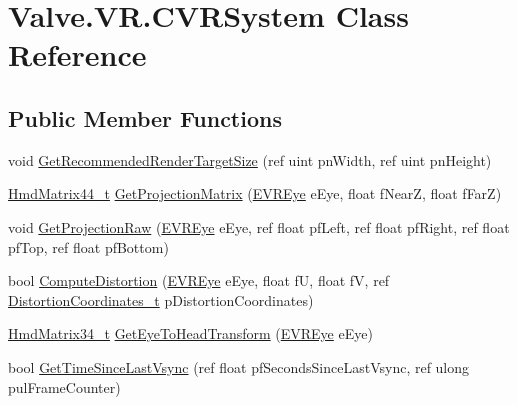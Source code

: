 \hypertarget{class_valve_1_1_v_r_1_1_c_v_r_system}{}\section{Valve.\+V\+R.\+C\+V\+R\+System Class Reference}
\label{class_valve_1_1_v_r_1_1_c_v_r_system}
\subsection*{Public Member Functions}
\begin{DoxyCompactItemize}
\item 
void \mbox{\hyperlink{class_valve_1_1_v_r_1_1_c_v_r_system_a51783a0590f7d858c6b7a073c961e910}{Get\+Recommended\+Render\+Target\+Size}} (ref uint pn\+Width, ref uint pn\+Height)
\item 
\mbox{\hyperlink{struct_valve_1_1_v_r_1_1_hmd_matrix44__t}{Hmd\+Matrix44\+\_\+t}} \mbox{\hyperlink{class_valve_1_1_v_r_1_1_c_v_r_system_a8e06a8dc62a3d7d82a8672a024d4a3d3}{Get\+Projection\+Matrix}} (\mbox{\hyperlink{namespace_valve_1_1_v_r_a8153d4a3e627e1cede046327087c1880}{E\+V\+R\+Eye}} e\+Eye, float f\+NearZ, float f\+FarZ)
\item 
void \mbox{\hyperlink{class_valve_1_1_v_r_1_1_c_v_r_system_a6154e9257dca79f7c208c3e737160d4f}{Get\+Projection\+Raw}} (\mbox{\hyperlink{namespace_valve_1_1_v_r_a8153d4a3e627e1cede046327087c1880}{E\+V\+R\+Eye}} e\+Eye, ref float pf\+Left, ref float pf\+Right, ref float pf\+Top, ref float pf\+Bottom)
\item 
bool \mbox{\hyperlink{class_valve_1_1_v_r_1_1_c_v_r_system_a9df1c714a1b2d358f98a4028122ccedb}{Compute\+Distortion}} (\mbox{\hyperlink{namespace_valve_1_1_v_r_a8153d4a3e627e1cede046327087c1880}{E\+V\+R\+Eye}} e\+Eye, float fU, float fV, ref \mbox{\hyperlink{struct_valve_1_1_v_r_1_1_distortion_coordinates__t}{Distortion\+Coordinates\+\_\+t}} p\+Distortion\+Coordinates)
\item 
\mbox{\hyperlink{struct_valve_1_1_v_r_1_1_hmd_matrix34__t}{Hmd\+Matrix34\+\_\+t}} \mbox{\hyperlink{class_valve_1_1_v_r_1_1_c_v_r_system_a71db4b263545bd87e2972eef7a27dca3}{Get\+Eye\+To\+Head\+Transform}} (\mbox{\hyperlink{namespace_valve_1_1_v_r_a8153d4a3e627e1cede046327087c1880}{E\+V\+R\+Eye}} e\+Eye)
\item 
bool \mbox{\hyperlink{class_valve_1_1_v_r_1_1_c_v_r_system_afd1fefe2c93366053820330d68303ad7}{Get\+Time\+Since\+Last\+Vsync}} (ref float pf\+Seconds\+Since\+Last\+Vsync, ref ulong pul\+Frame\+Counter)
\item 

\end{DoxyCompactItemize}
